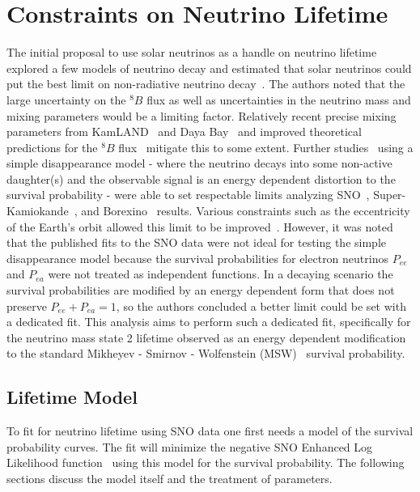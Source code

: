 \chapter{Constraints on Neutrino Lifetime}
\label{ch:lifetime}


The initial proposal to use solar neutrinos as a handle on neutrino lifetime explored a few models of neutrino decay and estimated that solar neutrinos could put the best limit on non-radiative neutrino decay~\cite{beacombell}.
The authors noted that the large uncertainty on the $^8B$ flux as well as uncertainties in the neutrino mass and mixing parameters would be a limiting factor.
Relatively recent precise mixing parameters from KamLAND~\cite{kamland} and Daya Bay~\cite{dayabay} and improved theoretical predictions for the $^8B$ flux~\cite{serenelli} mitigate this to some extent.
Further studies~\cite{berryman} using a simple disappearance model - where the neutrino decays into some non-active daughter(s) and the observable signal is an energy dependent distortion to the survival probability - were able to set respectable limits analyzing SNO~\cite{sno}, Super-Kamiokande~\cite{superk}, and Borexino~\cite{borexino} results.
Various constraints such as the eccentricity of the Earth's orbit allowed this limit to be improved~\cite{picoreti}. 
However, it was noted~\cite{berryman} that the published fits to the SNO data were not ideal for testing the simple disappearance model because the survival probabilities for electron neutrinos $P_{ee}$ and $P_{ea}$ were not treated as independent functions.
In a decaying scenario the survival probabilities are modified by an energy dependent form that does not preserve $P_{ee} + P_{ea} = 1$, so the authors concluded a better limit could be set with a dedicated fit.
This analysis aims to perform such a dedicated fit, specifically for the neutrino mass state 2 lifetime observed as an energy dependent modification to the standard Mikheyev - Smirnov - Wolfenstein (MSW)~\cite{wolfenstein,mikheyev} survival probability.

\section{Lifetime Model}
\label{lifetime_model}

To fit for neutrino lifetime using SNO data one first needs a model of the survival probability curves.
The fit will minimize the negative SNO Enhanced Log Likelihood function~\cite{plthesis} using this model for the survival probability.
The following sections discuss the model itself and the treatment of parameters.

